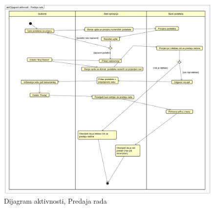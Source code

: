 			 \begin{figure}[H]
			 	\includegraphics[width= 15 cm, height= 25 cm, keepaspectratio]{dijagrami/Dijagram aktivnosti - Predaja rada.png} 
			 	\centering
			 	\caption{Dijagram aktivnosti, Predaja rada}
			 	\label{fig:act2}
			 \end{figure}

